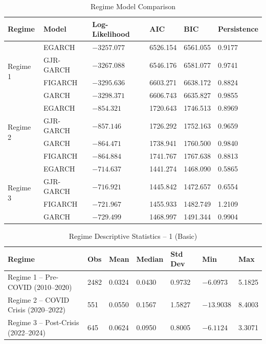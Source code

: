 \begin{table}[H]
\centering
\caption{Regime Model Comparison}
\label{tab:regime model comaparison}
\begin{tabular}{|l|l|l|l|l|l|}
\hline
\textbf{Regime} & \textbf{Model} & \textbf{Log-Likelihood} & \textbf{AIC} & \textbf{BIC} & \textbf{Persistence} \\
\hline
\multirow{4}{*}{Regime 1}
 & EGARCH      & $-3257.077$ & 6526.154 & 6561.055 & 0.9177 \\
 & GJR-GARCH   & $-3267.088$ & 6546.176 & 6581.077 & 0.9741 \\
 & FIGARCH & $-3295.636$ & 6603.271 & 6638.172 & 0.8824 \\
 & GARCH       & $-3298.371$ & 6606.743 & 6635.827 & 0.9855 \\
\hline
\multirow{4}{*}{Regime 2}
 & EGARCH      & $-854.321$ & 1720.643 & 1746.513 & 0.8969 \\
 & GJR-GARCH   & $-857.146$ & 1726.292 & 1752.163 & 0.9659 \\
 & GARCH       & $-864.471$ & 1738.941 & 1760.500 & 0.9840 \\
 & FIGARCH & $-864.884$ & 1741.767 & 1767.638 & 0.8813 \\
\hline
\multirow{4}{*}{Regime 3}
 & EGARCH      & $-714.637$ & 1441.274 & 1468.090 & 0.5865 \\
 & GJR-GARCH   & $-716.921$ & 1445.842 & 1472.657 & 0.6554 \\
 & FIGARCH & $-721.967$ & 1455.933 & 1482.749 & 1.2109 \\
 & GARCH       & $-729.499$ & 1468.997 & 1491.344 & 0.9904 \\
\hline
\end{tabular}
\end{table}

\begin{table}[H]
\centering
\caption{Regime Descriptive Statistics -- 1 (Basic)}
\label{regime desc stat 1}
\begin{tabular}{|l|l|l|l|l|l|l|}
\hline
\textbf{Regime} & \textbf{Obs} & \textbf{Mean} & \textbf{Median} & \textbf{Std Dev} & \textbf{Min} & \textbf{Max} \\
\hline
Regime 1 -- Pre-COVID (2010--2020)    & 2482 & 0.0324 & 0.0430 & 0.9732 & $-6.0973$  & 5.1825 \\
\hline
Regime 2 -- COVID Crisis (2020--2022) & 551  & 0.0550 & 0.1567 & 1.5827 & $-13.9038$ & 8.4003 \\
\hline
Regime 3 -- Post-Crisis (2022--2024)  & 645  & 0.0624 & 0.0950 & 0.8005 & $-6.1124$  & 3.3071 \\
\hline
\end{tabular}
\end{table}

